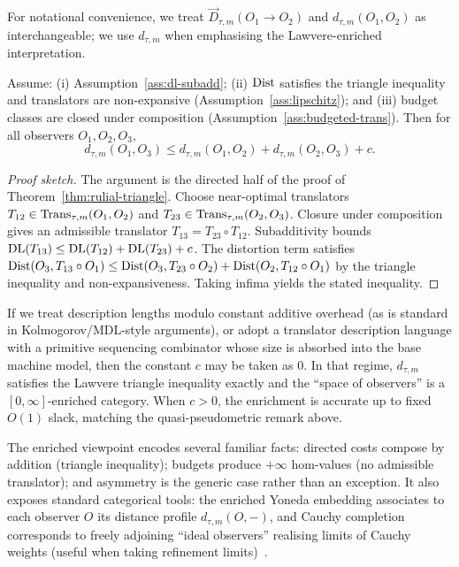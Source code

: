 \documentclass{aion}
\begin{document}
For notational convenience, we treat $\vec{D}_{\tau,m}(O_1\!\to\!O_2)$ and $d_{\tau,m}(O_1,O_2)$ as interchangeable;
we use $d_{\tau,m}$ when emphasising the Lawvere-enriched interpretation.

\begin{proposition}\label{prop:lawvere-triangle}
Assume:
(i) Assumption~\ref{ass:dl-subadd};
(ii) $\operatorname{Dist}$ satisfies the triangle inequality and translators are non-expansive (Assumption~\ref{ass:lipschitz});
and (iii) budget classes are closed under composition (Assumption~\ref{ass:budgeted-trans}).
Then for all observers $O_1,O_2,O_3$,
\[
  d_{\tau,m}(O_1,O_3)
  \le
  d_{\tau,m}(O_1,O_2) + d_{\tau,m}(O_2,O_3) + c.
\]
\end{proposition}

\begin{proof}[Proof sketch]
The argument is the directed half of the proof of Theorem~\ref{thm:rulial-triangle}.
Choose near-optimal translators $T_{12}\in\operatorname{Trans}_{\tau,m}(O_1,O_2)$ and $T_{23}\in\operatorname{Trans}_{\tau,m}(O_2,O_3)$.
Closure under composition gives an admissible translator $T_{13}=T_{23}\circ T_{12}$.
Subadditivity bounds $\operatorname{DL}(T_{13})\le \operatorname{DL}(T_{12})+\operatorname{DL}(T_{23})+c$.
The distortion term satisfies
$\operatorname{Dist}(O_3,T_{13}\circ O_1)\le \operatorname{Dist}(O_3,T_{23}\circ O_2)+\operatorname{Dist}(O_2,T_{12}\circ O_1)$
by the triangle inequality and non-expansiveness.
Taking infima yields the stated inequality.
\end{proof}

\begin{remark}
If we treat description lengths modulo constant additive overhead (as is standard in Kolmogorov/MDL-style arguments),
or adopt a translator description language with a primitive sequencing combinator whose size is absorbed into the base machine model,
then the constant $c$ may be taken as $0$.
In that regime, $d_{\tau,m}$ satisfies the Lawvere triangle inequality exactly and the ``space of observers''
is a $[0,\infty]$-enriched category.
When $c>0$, the enrichment is accurate up to fixed $O(1)$ slack, matching the quasi-pseudometric remark above.
\end{remark}

The enriched viewpoint encodes several familiar facts:
directed costs compose by addition (triangle inequality);
budgets produce $+\infty$ hom-values (no admissible translator);
and asymmetry is the generic case rather than an exception.
It also exposes standard categorical tools: the enriched Yoneda embedding associates to each observer $O$
its distance profile $d_{\tau,m}(O,-)$, and Cauchy completion corresponds to freely adjoining ``ideal observers''
realising limits of Cauchy weights (useful when taking refinement limits)~\cite{Kelly82}.
\end{document}
